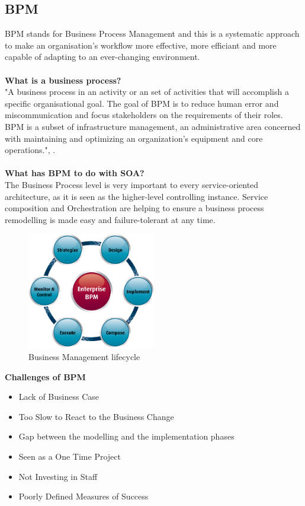 \documentclass[12pt]{article}
\begin{document}
\subsection{BPM}
BPM stands for Business Process Management and this is a systematic approach to make an organisation's workflow more effective, more efficiant and more capable of adapting to an ever-changing environment. 
\\ \\\textbf{What is a business process?}\\
"A business process in an activity or an set of activities that will accomplish a specific organisational goal. The goal of BPM is to reduce human error and miscommunication and focus stakeholders on the requirements of their roles. BPM is a subset of infrastructure management, an administrative area concerned with maintaining and optimizing an organization's equipment and core operations.", \cite{bpmdef}.
\\ \\\textbf{What has BPM to do with SOA?}\\
The Business Process level is very important to every service-oriented architecture, as it is seen as the higher-level controlling instance. Service composition and Orchestration are helping to ensure a business process remodelling is made easy and failure-tolerant at any time. \cite[page 114]{te}
\begin{figure}[here!]
	\centering
	\includegraphics[width=0.5\textwidth]{images/bpm.png}
	\caption{Business Management lifecycle \cite{muede2}}
	\label{fig:anfang}
	\end{figure}
	\FloatBarrier \noindent
\textbf{Challenges of BPM \cite{bpmchall}}
\begin{itemize}
\item Lack of Business Case
\item Too Slow to React to the Business Change
\item Gap between the modelling and the implementation phases
\item Seen as a One Time Project 
\item Not Investing in Staff
\item Poorly Defined Measures of Success 
\end{itemize}
\end{document}
